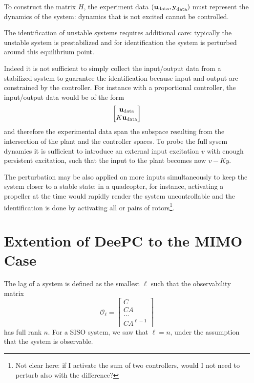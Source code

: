 To construct the matrix $H$, the experiment data $(\boldsymbol{\mathrm{u}}_\textrm{data},\boldsymbol{\mathrm{y}}_\textrm{data})$ must represent the dynamics of the system: dynamics that is not excited cannot be controlled.

The identification of unstable systems requires additional care: typically the unstable system is prestabilized and for identification the system is perturbed around this equilibrium point.

Indeed it is not sufficient to simply collect the input/output data from a stabilized system to guarantee the identification because input and output are constrained by the controller. For instance with a proportional controller, the input/output data would be of the form
\begin{equation*}
  \begin{bmatrix}
    \boldsymbol{\mathrm{u}}_\textrm{data} \\ K\boldsymbol{\mathrm{u}}_\textrm{data}
  \end{bmatrix}
\end{equation*}
and therefore the experimental data span the subspace resulting from the intersection of the plant and the controller spaces. To probe the full sysem dynamics it is sufficient to introduce an external input excitation $v$ with enough persistent excitation, such that the input to the plant becomes now $v - Ky$.

The perturbation may be also applied on more inputs simultaneously to keep the system closer to a stable state: in a quadcopter, for instance, activating a propeller at the time would rapidly render the system uncontrollable and the identification is done by activating all or pairs of rotors\footnote{Not clear here: if I activate the sum of two controllers, would I not need to perturb also with the difference?}.


\section{Extention of DeePC to the MIMO Case}

The lag of a system is defined as the smallest $\ell$ such that the observability matrix
\begin{equation*}
  \mathcal{O}_\ell =
  \begin{bmatrix}
    C \\ CA \\ \ldots \\ CA^{\ell-1}
  \end{bmatrix}
\end{equation*}
has full rank $n$. For a SISO system, we saw that $\ell=n$, under the assumption that the system is observable.

